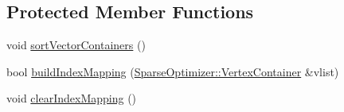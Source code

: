 \subsection*{Protected Member Functions}
\begin{DoxyCompactItemize}
\item 
void \mbox{\hyperlink{classg2o_1_1_sparse_optimizer_a8a8c6f08bc9b8a4e520aa73198268991}{sort\+Vector\+Containers}} ()
\item 
bool \mbox{\hyperlink{classg2o_1_1_sparse_optimizer_a8c6af9785e85153ade1490beacad73ce}{build\+Index\+Mapping}} (\mbox{\hyperlink{classg2o_1_1_hyper_graph_a9339534c99300a0ddac87ba976ef188c}{Sparse\+Optimizer\+::\+Vertex\+Container}} \&vlist)
\item 
void \mbox{\hyperlink{classg2o_1_1_sparse_optimizer_ab6f1f4ad2b1fd50b8019c6abb89ac6a8}{clear\+Index\+Mapping}} ()
\end{DoxyCompactItemize}

